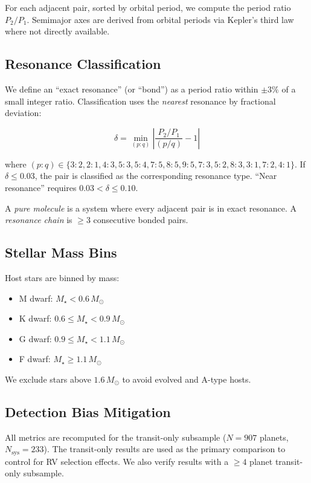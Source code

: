 \documentclass[twocolumn]{aastex631}
\begin{document}
For each adjacent pair, sorted by orbital period, we compute the period ratio
$P_2/P_1$. Semimajor axes are derived from orbital periods via Kepler's third
law where not directly available.

\subsection{Resonance Classification}

We define an ``exact resonance'' (or ``bond'') as a period ratio within
$\pm 3\%$ of a small integer ratio. Classification uses the \textit{nearest}
resonance by fractional deviation:

\begin{equation}
  \delta = \min_{(p:q)}\left|\frac{P_2/P_1}{(p/q)} - 1\right|
\end{equation}

where $(p:q) \in \{3:2, 2:1, 4:3, 5:3, 5:4, 7:5, 8:5, 9:5, 7:3, 5:2, 8:3,
3:1, 7:2, 4:1\}$. If $\delta \leq 0.03$, the pair is classified as the
corresponding resonance type. ``Near resonance'' requires $0.03 < \delta \leq
0.10$.

A \textit{pure molecule} is a system where every adjacent pair is in exact
resonance. A \textit{resonance chain} is $\geq 3$ consecutive bonded pairs.

\subsection{Stellar Mass Bins}

Host stars are binned by mass:
\begin{itemize}
  \item M dwarf: $M_\star < 0.6\,M_\odot$
  \item K dwarf: $0.6 \leq M_\star < 0.9\,M_\odot$
  \item G dwarf: $0.9 \leq M_\star < 1.1\,M_\odot$
  \item F dwarf: $M_\star \geq 1.1\,M_\odot$
\end{itemize}

We exclude stars above $1.6\,M_\odot$ to avoid evolved and A-type hosts.

\subsection{Detection Bias Mitigation}

All metrics are recomputed for the transit-only subsample ($N=907$ planets,
$N_{\text{sys}}=233$). The transit-only results are used as the primary
comparison to control for RV selection effects. We also verify results with a
$\geq 4$ planet transit-only subsample.
\end{document}
